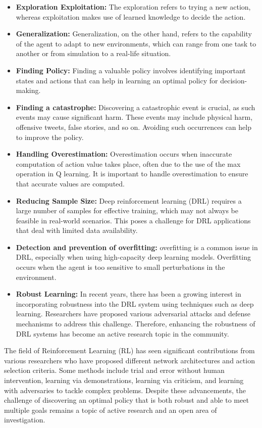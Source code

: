 \documentclass[12pt,oneside]{article}
\begin{document}
\begin{itemize}
\item  \textbf{Exploration Exploitation: }The exploration refers to trying a new action, whereas exploitation makes use of learned knowledge to decide the action.
\item \textbf{Generalization:} Generalization, on the other hand, refers to the capability of the agent to adapt to new environments, which can range from one task to another or from simulation to a real-life situation.
\item \textbf{Finding Policy:} Finding a valuable policy involves identifying important states and actions that can help in learning an optimal policy for decision-making.
\item \textbf{Finding a catastrophe:} Discovering a catastrophic event is crucial, as such events may cause significant harm. These events may include physical harm, offensive tweets, false stories, and so on. Avoiding such occurrences can help to improve the policy.
\item \textbf{Handling Overestimation:} Overestimation occurs when inaccurate computation of action value takes place, often due to the use of the max operation in Q learning. It is important to handle overestimation to ensure that accurate values are computed.
\item \textbf{Reducing Sample Size:} Deep reinforcement learning (DRL) requires a large number of samples for effective training, which may not always be feasible in real-world scenarios. This poses a challenge for DRL applications that deal with limited data availability.
\item \textbf{Detection and prevention of overfitting:} overfitting is a common issue in DRL, especially when using high-capacity deep learning models. Overfitting occurs when the agent is too sensitive to small perturbations in the environment.
\item \textbf{Robust Learning:} In recent years, there has been a growing interest in incorporating robustness into the DRL system using techniques such as deep learning. Researchers have proposed various adversarial attacks and defense mechanisms to address this challenge. Therefore, enhancing the robustness of DRL systems has become an active research topic in the community.
\end{itemize}
 
The field of Reinforcement Learning (RL) has seen significant contributions from various researchers who have proposed different network architectures and action selection criteria. Some methods include trial and error without human intervention, learning via demonstrations, learning via criticism, and learning with adversaries to tackle complex problems. Despite these advancements, the challenge of discovering an optimal policy that is both robust and able to meet multiple goals remains a topic of active research and an open area of investigation.
\end{document}
